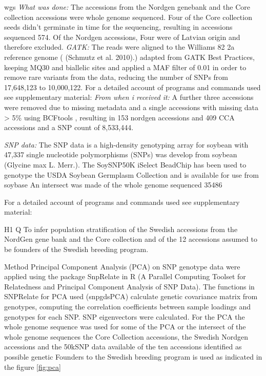 \documentclass[9pt, onecolumn,twoside]{gsajnl}
\begin{document}
wgs
\textit{What was done:} The accessions from the Nordgen genebank and the Core collection accessions were whole genome sequenced. Four of the Core collection seeds didn't germinate in time for the sequencing, resulting in accessions sequenced 574. Of the Nordgen accessions, Four were of Latvian origin and therefore excluded. 
\textit{GATK:} The reads were aligned to the Williams 82 2a reference genome ( (Schmutz et al. 2010).) adapted from GATK Best Practices, keeping MQ30 and biallelic sites and applied a MAF filter of 0.01 in order to remove rare variants from the data, reducing the number of SNPs from 17,648,123 to 10,000,122. 
For a detailed account of programs and commands used see supplementary material:  
\textit{From when i received it:} A further three accessions were removed due to missing metadata and a single accessions with missing data > 5\% using BCFtools \cite{bcftools}, resulting in 153 nordgen accessions and 409 CCA accessions and a SNP count of 8,533,444. 


\textit{SNP data:} The SNP data is a high-density genotyping array for soybean with 47,337 single nucleotide polymorphisms (SNPs) was develop from soybean (Glycine max L. Merr.). The SoySNP50K iSelect BeadChip has been used to genotype the USDA Soybean Germplasm Collection and is available for use from soybase
 An intersect was made of the whole genome sequenced
35486

For a detailed account of programs and commands used see supplementary material: 

H1
Q 
To infer population stratification of the Swedish accessions from the NordGen gene bank and the Core collection and of the 12 accessions assumed to be founders of the Swedish breeding program.

Method
Principal Component Analysis (PCA) on SNP genotype data were applied using the package SnpRelate in R (A Parallel Computing Toolset for Relatedness and Principal Component Analysis of SNP Data). The functions in SNPRelate for PCA used (snpgdsPCA) calculate genetic covariance matrix from genotypes, computing the correlation coefficients between sample loadings and genotypes for each SNP. SNP eigenvectors were calculated. For the PCA the whole genome sequence was used for some of the PCA or the  intersect of the whole genome sequences the Core Collection accessions, the Swedish Nordgen accessions and the 50kSNP data available of the ten accessions identified as possible genetic Founders to the Swedish breeding program is used as indicated in the figure \ref{fig:pca}
\end{document}
